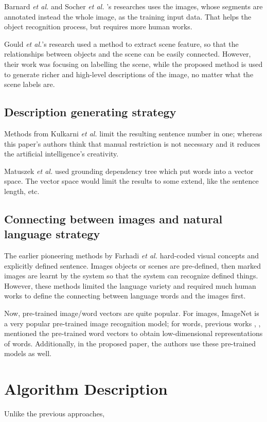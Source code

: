 \documentclass[10pt,twocolumn,letterpaper]{article}
\begin{document}
Barnard \textit{et al.} \cite{barnard} and Socher \textit{et al.} \cite{socher}'s researches uses the images,
whose segments are annotated instead the whole image, as the training input data.
That helps the object recognition process, but requires more human works.

Gould \textit{et al.}'s research \cite {gould} used a method to extract scene feature,
so that the relationships between objects and the scene can be easily connected.
However, their work was focusing on labelling the scene, while the proposed method is used to
generate richer and high-level descriptions of the image, no matter what the scene labels are.


\subsection{Description generating strategy}
Methods from Kulkarni \textit{et al.} \cite{kulkarni} limit the resulting sentence number in one;
whereas this paper's authors think that manual restriction is not necessary and it reduces the artificial intelligence's creativity.

Matuszek \textit{et al.} \cite{matuszek} used grounding dependency tree which put words into a vector space.
The vector space would limit the results to some extend, like the sentence length, etc.


\subsection{Connecting between images and natural language strategy}
The earlier pioneering methods by Farhadi \textit{et al.} \cite{farhadi} hard-coded visual concepts and explicitly defined sentence.
Images objects or scenes are pre-defined, then marked images are learnt by the system so that the system can recognize defined things.
However, these methods limited the language variety and required much human works to define the connecting between language words and the images first.

Now, pre-trained image/word vectors are quite popular.
For images, ImageNet \cite{imagenet} is a very popular pre-trained image recognition model;
for words, previous works \cite{bengio}, \cite{socher2}, \cite{mikolov} mentioned the pre-trained word vectors
to obtain low-dimensional representations of words.
Additionally, in the proposed paper, the authors use these pre-trained models as well.


\section{Algorithm Description}
Unlike the previous approaches,
\end{document}
